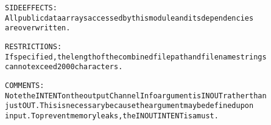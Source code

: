 \begin{alltt}
  SIDE EFFECTS:
        All public data arrays accessed by this module and its dependencies
        are overwritten.
 
  RESTRICTIONS:
        If specified, the length of the combined file path and filename strings
        cannot exceed 2000 characters.
 
  COMMENTS:
        Note the INTENT on the output ChannelInfo argument is IN OUT rather than
        just OUT. This is necessary because the argument may be defined upon
        input. To prevent memory leaks, the IN OUT INTENT is a must.
 
  \end{alltt}
